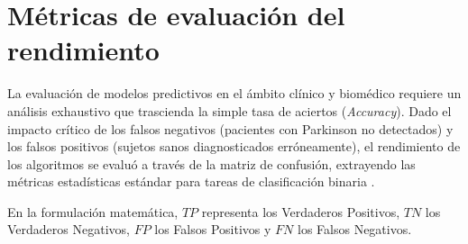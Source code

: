 \section{Métricas de evaluación del rendimiento}
\label{sec:metricas}

La evaluación de modelos predictivos en el ámbito clínico y biomédico requiere un análisis exhaustivo que trascienda la simple tasa de aciertos (\textit{Accuracy}). Dado el impacto crítico de los falsos negativos (pacientes con Parkinson no detectados) y los falsos positivos (sujetos sanos diagnosticados erróneamente), el rendimiento de los algoritmos se evaluó a través de la matriz de confusión, extrayendo las métricas estadísticas estándar para tareas de clasificación binaria \cite{sokolova2009}. 

En la formulación matemática, $TP$ representa los Verdaderos Positivos, $TN$ los Verdaderos Negativos, $FP$ los Falsos Positivos y $FN$ los Falsos Negativos.

